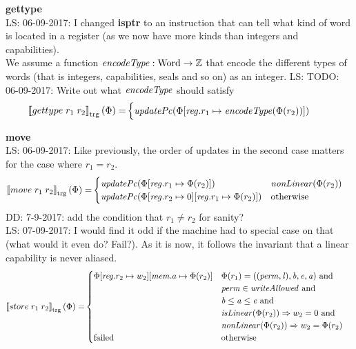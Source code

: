 \documentclass[a4paper]{article}
\newcommand\lau[1]{{\color{purple} \sf \footnotesize {LS: #1}}\\}
\newcommand\dominique[1]{{\color{purple} \sf \footnotesize {DD: #1}}\\}
\newcommand{\sem}[1]{\left\llbracket #1 \right\rrbracket}
\newcommand{\tsem}[2][\Phi]{\sem{#2}_{\mathrm{trg}}(#1)}
\newcommand{\tand}{\text{ and }}
\newcommand{\totherwise}{\text{otherwise }}
\newcommand{\targetcolor}[1]{\color{black}}
\newcommand{\trg}[1]{{\targetcolor{} #1}}
\newcommand{\zinstr}[1]{#1}
\newcommand{\twoinstr}[3]{
  \ifthenelse{\equal{#2#3}{}}
  {\zinstr{#1}}
  {\zinstr{#1} \; #2 \; #3}
}
\newcommand{\tisptr}[2]{\twoinstr{\trg{gettype}}{#1}{#2}}
\newcommand{\tmove}[2]{\twoinstr{\trg{move}}{#1}{#2}}
\newcommand{\tstore}[2]{\twoinstr{\trg{store}}{#1}{#2}}
\newcommand{\ints}{\mathbb{Z}}
\newcommand{\update}[2]{[#1 \mapsto #2]}
\newcommand{\updReg}[2]{\update{\reg.#1}{#2}}
\newcommand{\shareddom}[1]{\mathrm{#1}}
\newcommand{\Word}{\shareddom{Word}}
\newcommand{\perm}{\var{perm}}
\newcommand{\lin}{\var{l}}
\newcommand{\failed}{\mathrm{failed}}
\newcommand{\var}[1]{\mathit{#1}}
\newcommand{\reg}{\var{reg}}
\newcommand{\mem}{\var{mem}}
\newcommand{\baddr}{\var{b}}
\newcommand{\eaddr}{\var{e}}
\newcommand{\aaddr}{\var{a}}
\newcommand{\plainfun}[2]{
  \ifthenelse{\equal{#2}{}}
  {\mathit{#1}}
  {\mathit{#1}(#2)}
}
\newcommand{\encType}[1]{\plainfun{encodeType}{#1}}
\newcommand{\updPcAddr}[1]{\plainfun{updatePc}{#1}}
\newcommand{\writeAllowed}[1]{\plainfun{writeAllowed}{#1}}
\newcommand{\nonLinear}[1]{\plainfun{nonLinear}{#1}}
\newcommand{\isLinear}[1]{\plainfun{isLinear}{#1}}
\begin{document}
\textbf{gettype}\\
\lau{06-09-2017: I changed \textbf{isptr} to an instruction that can tell what kind of word is located in a register (as we now have more kinds than integers and capabilities).}
We assume a function $\encType{} : \Word \rightarrow \ints$ that encode the different types of words (that is integers, capabilities, seals and so on) as an integer.
\lau{TODO: 06-09-2017: Write out what $\encType{}$ should satisfy}
\begin{align*}
  \tsem{\tisptr{r_1}{r_2}} = & 
                               \begin{cases}
                                 \updPcAddr{}(\Phi\updReg{r_1}{\encType{\Phi(r_2)}})
                               \end{cases}
\end{align*}

\textbf{move}\\
\lau{06-09-2017: Like previously, the order of updates in the second case matters for the case where $r_1 = r_2$.}
\begin{align*}
  \tsem{\tmove{r_1}{r_2}} = & 
                              \begin{cases}
                                \updPcAddr{\Phi\updReg{r_1}{\Phi(r_2)}} & \nonLinear{\Phi(r_2)}\\
                                \updPcAddr{\Phi\updReg{r_2}{0}\updReg{r_1}{\Phi(r_2)}} & \totherwise 
                              \end{cases}
\end{align*}
\dominique{7-9-2017: add the condition that $r_1 \neq r_2$ for sanity?}
\lau{07-09-2017: I would find it odd if the machine had to special case on that (what would it even do? Fail?). As it is now, it follows the invariant that a linear capability is never aliased.}

\begin{align*}
  \tsem{\tstore{r_1}{r_2}} = & 
                               \begin{cases}
                                 \Phi\updReg{r_2}{w_2}
                                     \update{\mem.a}{\Phi(r_2)} & \arraycolsep=0pt
                                     \begin{array}[t]{l}
                                       \Phi(r_1) = ((\perm,\lin),\baddr,\eaddr,\aaddr) \tand \\
                                       \perm \in \writeAllowed{} \tand \\
                                       \baddr \leq \aaddr \leq \eaddr \tand \\
                                       \isLinear{\Phi(r_2)} \Rightarrow w_2 = 0 \tand \\
                                       \nonLinear{\Phi(r_2)} \Rightarrow w_2 = \Phi(r_2)
                                     \end{array} \\
                                  \failed & \totherwise
                               \end{cases}
\end{align*}
\end{document}
